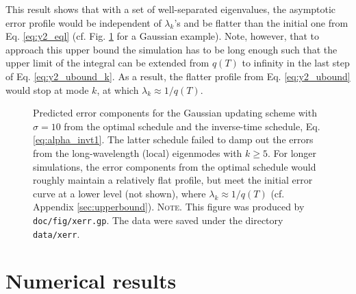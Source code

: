 \documentclass[preprint, floatfix]{revtex4-1}
\newcommand{\note}[1]{{\color{DarkGreen}\footnotesize \textsc{Note.} #1}}
\begin{document}
This result shows that with a set of well-separated eigenvalues,
the asymptotic error profile would be
independent of $\lambda_k$'s and
be flatter than the initial one from
Eq. \eqref{eq:y2_eql}
(cf. Fig. \ref{fig:xerr}
for a Gaussian example).
%
Note, however, that to approach this upper bound
the simulation has to be long enough
such that the upper limit of the integral
can be extended from $q(T)$ to infinity
in the last step of Eq. \eqref{eq:y2_ubound_k}.
%
As a result,
the flatter profile from Eq. \eqref{eq:y2_ubound}
would stop at mode $k$,
at which $\lambda_k \approx 1/q(T)$.

\begin{figure}[h]
\begin{center}
  \caption{
    \label{fig:xerr}
    Predicted error components for the Gaussian updating scheme
    with $\sigma = 10$
    from the optimal schedule
    and the inverse-time schedule, Eq. \eqref{eq:alpha_invt1}.
    The latter schedule failed to damp out the errors
    from the long-wavelength (local) eigenmodes
    with $k \ge 5$.
    For longer simulations,
    the error components from the optimal schedule
    would roughly maintain a relatively flat profile,
    but meet the initial error curve
    at a lower level (not shown),
    where $\lambda_k \approx 1/q(T)$
    (cf. Appendix \ref{sec:upperbound}).
    \note{This figure was produced by \texttt{doc/fig/xerr.gp}.
      The data were saved under the directory \texttt{data/xerr}.
    }%
  }
\end{center}
\end{figure}




\section{\label{sec:results}
Numerical results}
\end{document}
